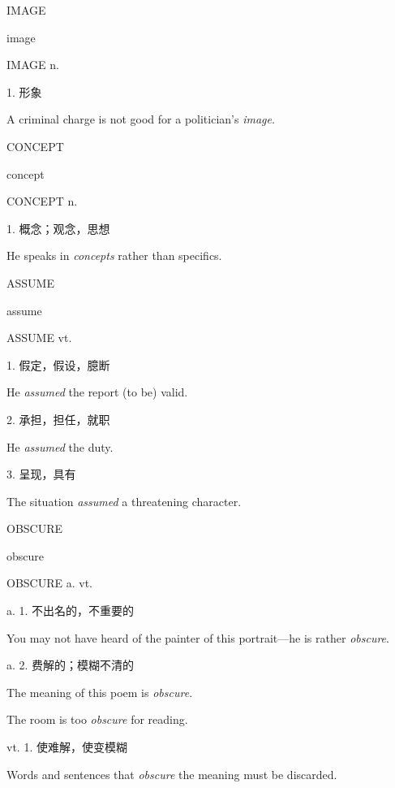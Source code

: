 \begin{flashcard}{
IMAGE

image
}
\begin{center}
IMAGE n. 
\end{center}
1. 形象

A criminal charge is not good for a politician's \textit{image}.

\end{flashcard}
\begin{flashcard}{
CONCEPT

concept
}
\begin{center}
CONCEPT n. 
\end{center}
1. 概念；观念，思想

He speaks in \textit{concepts} rather than specifics.

\end{flashcard}
\begin{flashcard}{
ASSUME

assume
}
\begin{center}
ASSUME vt. 
\end{center}
1. 假定，假设，臆断

He \textit{assumed} the report (to be) valid.

2. 承担，担任，就职

He \textit{assumed} the duty.

3. 呈现，具有

The situation \textit{assumed} a threatening character.

\end{flashcard}
\begin{flashcard}{
OBSCURE

obscure
}
\begin{center}
OBSCURE a. vt. 
\end{center}
a. 1. 不出名的，不重要的

You may not have heard of the painter of this portrait---he is rather \textit{obscure}.

a. 2. 费解的；模糊不清的

The meaning of this poem is \textit{obscure}.

The room is too \textit{obscure} for reading.

vt. 1. 使难解，使变模糊

Words and sentences that \textit{obscure} the meaning must be discarded.

\end{flashcard}
